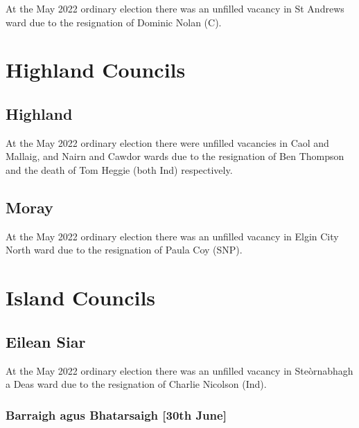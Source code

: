 \documentclass[a4paper,openany]{book}
\begin{document}
\begin{resultsiii}
At the May 2022 ordinary election there was an unfilled vacancy in St Andrews ward due to the resignation of Dominic Nolan (C).%

\section{Highland Councils}

\subsection*{Highland}

At the May 2022 ordinary election there were unfilled vacancies in Caol and Mallaig, and Nairn and Cawdor wards due to the resignation of Ben Thompson and the death of Tom Heggie (both Ind) respectively.%
%

\subsection*{Moray}

At the May 2022 ordinary election there was an unfilled vacancy in Elgin City North ward due to the resignation of Paula Coy (SNP).%

\section{Island Councils}

\subsection*{Eilean Siar}

At the May 2022 ordinary election there was an unfilled vacancy in Steòrnabhagh a Deas ward due to the resignation of Charlie Nicolson (Ind).%

\subsubsection*{Barraigh agus Bhatarsaigh \hspace*{\fill}\nolinebreak[1]%
	\enspace\hspace*{\fill}
	[30th June]}


\end{resultsiii}
\end{document}
